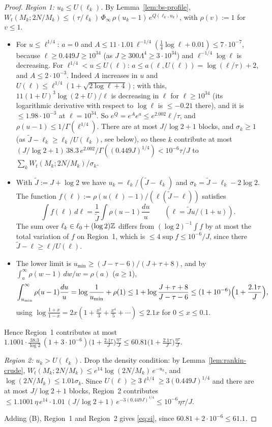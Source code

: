 \begin{proof}
\emph{Region 1: $u_k\le U(\ell_k)$.} By Lemma~\ref{lem:bs-profile},
$W_t(M_k;2N/M_k)\le(\tau/\ell_k)\,\Phi_\infty\,\rho(u_k-1)\,e^{Q(\ell_k,u_k)}$, with $\rho(v):=1$ for $v\le1$.
\begin{itemize}
\item For $u\le\ell^{1/4}$: $a=0$ and $A\le11\cdot1.01\,\ell^{-1/4}(\frac14\log\ell+0.01)\le7\cdot10^{-7}$, because
  $\ell\ge0.449J\ge10^{34}$ (as $J\ge300\Lambda^4\ge3\cdot10^{34}$) and $\ell^{-1/4}\log\ell$ is decreasing.
  For $\ell^{1/4}<u\le U(\ell)$: $a\le a(\ell,U(\ell))=\log(\ell/\tau)+2$, and $A\le2\cdot10^{-3}$. Indeed $A$ increases in $u$
  and $U(\ell)\le\ell^{1/4}(1+\sqrt{2\log\ell+4})$; with this, $11(1+U)^3\log(2+U)/\ell$ is decreasing in $\ell$ for
  $\ell\ge10^{34}$ (its logarithmic derivative with respect to $\log\ell$ is $\le-0.21$ there), and it is $\le1.98\cdot10^{-3}$ at
  $\ell=10^{34}$. So $e^{Q}=e^Ae^a\le e^{2.002}\ell/\tau$, and $\rho(u-1)\le1/\Gamma(\ell^{1/4})$. There are at most
  $J/\log2+1$ blocks, and $\sigma_k\ge1$ (as $\tilde J-\ell_k\ge\ell_k/U(\ell_k)$, see below), so these $k$ contribute at most
  $(J/\log2+1)\,38.3\,e^{2.002}/\Gamma((0.449J)^{1/4})<10^{-6}\tau/J$ to $\sum_kW_t(M_k;2N/M_k)/\sigma_k$.
\item With $\tilde J:=J+\log2$ we have $u_k=\ell_k/(\tilde J-\ell_k)$ and $\sigma_k=\tilde J-\ell_k-2\log2$. The function
  $f(\ell):=\rho(u(\ell)-1)/(\ell(\tilde J-\ell))$ satisfies
  \[
    \int f(\ell)\,d\ell=\frac1{\tilde J}\int\rho(u-1)\frac{du}u\qquad(\ell=\tilde Ju/(1+u)).
  \]
  The sum over $\ell_k\in\ell_0+(\log2)\mathbb{Z}$ differs from $(\log2)^{-1}\int f$ by at most the total variation of $f$ on
  Region~1, which is $\le4\sup f\le10^{-6}/J$, since there $\tilde J-\ell\ge\ell/U(\ell)$.
\item The lower limit is $u_{\min}\ge(J-\tau-6)/(J+\tau+8)$, and by $\int_a^\infty\rho(w-1)\,dw/w=\rho(a)$ ($a\ge1$),
  \[
    \int_{u_{\min}}^\infty\rho(u-1)\frac{du}u=\log\frac1{u_{\min}}+\rho(1)\le1+\log\frac{J+\tau+8}{J-\tau-6}\le(1+10^{-6})\Bigl(1+\frac{2.1\tau}J\Bigr),
  \]
  using $\log\frac{1+x}{1-x}=2x(1+\frac{x^2}3+\frac{x^4}5+\cdots)\le2.1x$ for $0\le x\le0.1$.
\end{itemize}
Hence Region~1 contributes at most
$1.1001\cdot\frac{38.3}{\log2}\,(1+3\cdot10^{-6})\bigl(1+\frac{2.1\tau}J\bigr)\frac{\eta\tau}J
\le60.81\bigl(1+\frac{2.1\tau}J\bigr)\frac{\eta\tau}J$.

\emph{Region 2: $u_k>U(\ell_k)$.} Drop the density condition: by Lemma~\ref{lem:rankin-crude},
$W_t(M_k;2N/M_k)\le e^{14}\log(2N/M_k)\,e^{-u_k}$, and $\log(2N/M_k)\le1.01\sigma_k$. Since $U(\ell)\ge3\ell^{1/4}\ge3(0.449J)^{1/4}$
and there are at most $J/\log2+1$ blocks, Region~2 contributes $\le1.1001\,\eta\,e^{14}\cdot1.01\,(J/\log2+1)\,e^{-3(0.449J)^{1/4}}
\le10^{-6}\eta\tau/J$.

Adding (B), Region~1 and Region~2 gives \eqref{eq:si}, since $60.81+2\cdot10^{-6}\le61.1$.
\end{proof}

